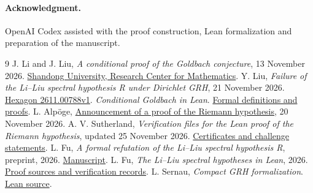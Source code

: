 \documentclass[11pt,a4paper]{article}
\begin{document}
\paragraph{Acknowledgment.} OpenAI Codex assisted with the proof construction, Lean formalization and preparation of the manuscript.

\begingroup\small
\begin{thebibliography}{9}
 J. Li and J. Liu, \emph{A conditional proof of the Goldbach conjecture}, 13 November 2026. \href{https://mrc.sdu.edu.cn/english/info/1018/1514.htm}{Shandong University, Research Center for Mathematics}.
 Y. Liu, \emph{Failure of the Li--Liu spectral hypothesis R under Dirichlet GRH}, 21 November 2026. \href{https://hexagonmath.org/2611.00788v1}{Hexagon 2611.00788v1}.
 \emph{Conditional Goldbach in Lean}. \href{https://github.com/subfish-zhou/conditional-goldbach-lean}{Formal definitions and proofs}.
 L. Alp\"oge, \href{https://alpo.ge/remark.pdf}{Announcement of a proof of the Riemann hypothesis}, 20 November 2026. A. V. Sutherland, \emph{Verification files for the Lean proof of the Riemann hypothesis}, updated 25 November 2026. \href{https://math.mit.edu/~drew/grh/}{Certificates and challenge statements}.
 L. Fu, \emph{A formal refutation of the Li--Liu spectral hypothesis R}, preprint, 2026.
\href{https://github.com/RaymondVoldemortFu/li-liu-spectral-hypotheses-lean/blob/main/paper/R/refutation-of-R.pdf}{Manuscript}.
 L. Fu, \emph{The Li--Liu spectral hypotheses in Lean}, 2026.
\href{https://github.com/RaymondVoldemortFu/li-liu-spectral-hypotheses-lean}{Proof sources and verification records}.
 L. Sernau, \emph{Compact GRH formalization}.
\href{https://github.com/lsernau/grh-lean/tree/main/grh-compact}{Lean source}.
\end{thebibliography}
\endgroup
\end{document}
